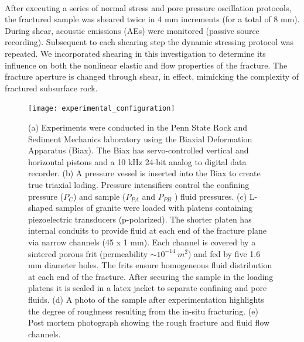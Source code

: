\documentclass[letterpaper,10pt]{article}
\begin{document}
\paragraph{} After executing a series of normal stress and pore pressure oscillation protocols, the fractured sample was sheared twice in 4 mm increments (for a total of 8 mm). During shear, acoustic emissions (AEs) were monitored (passive source recording). Subsequent to each shearing step the dynamic stressing protocol was repeated. We incorporated shearing in this investigation to determine its influence on both the nonlinear elastic and flow properties of the fracture. The fracture aperture is changed through shear, in effect, mimicking the complexity of fractured subsurface rock.

\newpage

\begin{figure}[ht]
	\centering
	\texttt{[image: experimental\_configuration]}
	\caption[]{(a) Experiments were conducted in the Penn State Rock and Sediment Mechanics laboratory using the Biaxial Deformation Apparatus (Biax). The Biax has servo-controlled vertical and horizontal pistons and a 10 kHz 24-bit analog to digital data recorder. (b) A pressure vessel is inserted into the Biax to create true triaxial loding. Pressure intensifiers control the confining pressure ($P_C$) and sample ($P_{PA}$ and $P_{PB}$ ) fluid pressures. (c) L-shaped samples of granite were loaded with platens containing piezoelectric transducers (p-polarized). The shorter platen has internal conduits to provide fluid at each end of the fracture plane via narrow channels (45 x 1 mm). Each channel is covered by a sintered porous frit (permeability $\sim 10^{-14}\ m^2$) and fed by five 1.6 mm diameter holes. The frits ensure homogeneous fluid distribution at each end of the fracture. After securing the sample in the loading platens it is sealed in a latex jacket to separate confining and pore fluids. (d) A photo of the sample after experimentation highlights the degree of roughness resulting from the in-situ fracturing. (e) Post mortem photograph showing the rough fracture and fluid flow channels. }
	\label{fig:samplesetup}
\end{figure}

\newpage
\end{document}
